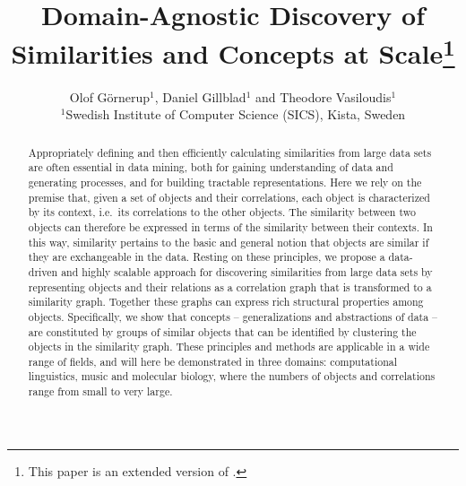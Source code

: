 \documentclass{kais}
\begin{document}
\label{firstpage}

\title{Domain-Agnostic Discovery of Similarities and Concepts at Scale\footnote{This paper is an extended version of \cite{Gornerup2015}.}}



\author[O. G\"{o}rnerup et al]{Olof G\"{o}rnerup$^1$, Daniel Gillblad$^1$ and Theodore Vasiloudis$^1$\\ 
$^1$Swedish Institute of Computer Science (SICS), Kista, Sweden}

\maketitle

\begin{abstract}
Appropriately defining and then efficiently calculating similarities from large data sets are often essential
in data mining, both for gaining understanding of data and generating processes, and for building tractable representations.
Here we rely on the premise that, given a set of objects and their correlations, each object is characterized
by its context, i.e.\ its correlations to the other objects. The similarity between two objects can therefore be 
expressed in terms of the similarity between their contexts. In this way, similarity pertains to the basic 
and general notion that objects are similar if they are exchangeable in the data. Resting on these principles, we propose a 
data-driven and highly scalable approach for discovering similarities from large data sets by representing objects 
and their relations as a correlation graph that is
transformed to a similarity graph. Together these graphs can express rich structural properties
among objects. Specifically, we show that concepts -- generalizations and abstractions of
data -- are constituted by groups of similar objects that can be identified
by clustering the objects in the similarity graph.
These principles and methods are applicable in a wide range of fields, and will here be demonstrated 
in three domains: computational linguistics, music and molecular biology, where the numbers of objects and correlations
range from small to very large.
\end{abstract}
\end{document}
